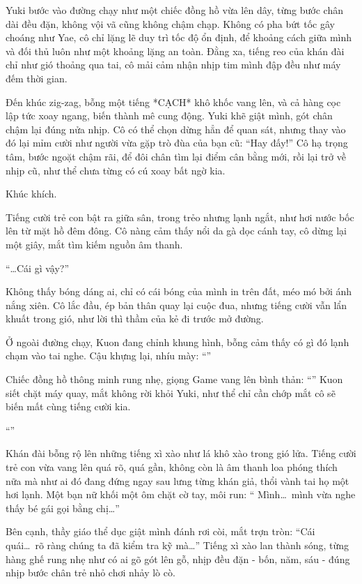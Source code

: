 \documentclass[../main.tex]{subfiles}
\begin{document}
Yuki bước vào đường chạy như một chiếc đồng hồ vừa lên dây, từng bước chân dài đều đặn, không vội vã cũng không chậm chạp. Không có pha bứt tốc gây choáng như Yae, cô chỉ lặng lẽ duy trì tốc độ ổn định, để khoảng cách giữa mình và đối thủ luôn như một khoảng lặng an toàn. Đằng xa, tiếng reo của khán đài chỉ như gió thoảng qua tai, cô mải cảm nhận nhịp tim mình đập đều như máy đếm thời gian.

Đến khúc zig-zag, bỗng một tiếng *CẠCH* khô khốc vang lên, và cả hàng cọc lập tức xoay ngang, biến thành mê cung động. Yuki khẽ giật mình, gót chân chậm lại đúng nửa nhịp. Cô có thể chọn dừng hẳn để quan sát, nhưng thay vào đó lại mỉm cười như người vừa gặp trò đùa của bạn cũ: ``Hay đấy!'' Cô hạ trọng tâm, bước ngoặt chậm rãi, để đôi chân tìm lại điểm cân bằng mới, rồi lại trở về nhịp cũ, như thể chưa từng có cú xoay bất ngờ kia.

Khúc khích.

Tiếng cười trẻ con bật ra giữa sân, trong trẻo nhưng lạnh ngắt, như hơi nước bốc lên từ mặt hồ đêm đông. Cô nàng cảm thấy nổi da gà dọc cánh tay, cô dừng lại một giây, mắt tìm kiếm nguồn âm thanh.

``\dots Cái gì vậy?''

Không thấy bóng dáng ai, chỉ có cái bóng của mình in trên đất, méo mó bởi ánh nắng xiên. Cô lắc đầu, ép bản thân quay lại cuộc đua, nhưng tiếng cười vẫn lẩn khuất trong gió, như lời thì thầm của kẻ đi trước mở đường.

Ở ngoài đường chạy, Kuon đang chỉnh khung hình, bỗng cảm thấy có gì đó lạnh chạm vào tai nghe. Cậu khựng lại, nhíu mày: ``''

Chiếc đồng hồ thông minh rung nhẹ, giọng Game vang lên bình thản: ``'' Kuon siết chặt máy quay, mắt không rời khỏi Yuki, như thể chỉ cần chớp mắt cô sẽ biến mất cùng tiếng cười kia.

``''

Khán đài bỗng rộ lên những tiếng xì xào như lá khô xào trong gió lửa. Tiếng cười trẻ con vừa vang lên quá rõ, quá gần, không còn là âm thanh loa phóng thích nữa mà như ai đó đang đứng ngay sau lưng từng khán giả, thổi vành tai họ một hơi lạnh. Một bạn nữ khối một ôm chặt cờ tay, môi run: `` Mình\dots\ mình vừa nghe thấy bé gái gọi bằng chị\dots''

Bên cạnh, thầy giáo thể dục giật mình đánh rơi còi, mắt trợn tròn: ``Cái quái\dots\ rõ ràng chúng ta đã kiểm tra kỹ mà\dots'' Tiếng xì xào lan thành sóng, từng hàng ghế rung nhẹ như có ai gõ gót lên gỗ, nhịp đều đặn - bốn, năm, sáu - đúng nhịp bước chân trẻ nhỏ chơi nhảy lò cò.
\end{document}
